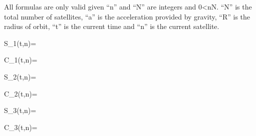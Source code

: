 \centerline{All formulas are only valid given “n” and “N” are integers and 0<nN. “N” is the total number of satellites, “a” is the acceleration provided by gravity, “R” is the radius of orbit, “t” is the current time and “n” is the current satellite.}

\centerline{S_1(t,n)=}

\centerline{C_1(t,n)=}

\centerline{S_2(t,n)=}

\centerline{C_2(t,n)=}

\centerline{S_3(t,n)=}

\centerline{C_3(t,n)=}
